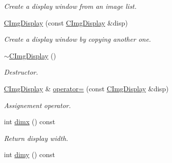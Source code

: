 \begin{DoxyCompactItemize}
\begin{DoxyCompactList}\small\item\em Create a display window from an image list. \item\end{DoxyCompactList}\item 
\hyperlink{structcimg__library_1_1_c_img_display_ad4267bd4ac382369ba69af62eb110794}{CImgDisplay} (const \hyperlink{structcimg__library_1_1_c_img_display}{CImgDisplay} \&disp)
\begin{DoxyCompactList}\small\item\em Create a display window by copying another one. \item\end{DoxyCompactList}\item 
\hypertarget{structcimg__library_1_1_c_img_display_ac74bd2dc3ff700966eae996505e63080}{
\hyperlink{structcimg__library_1_1_c_img_display_ac74bd2dc3ff700966eae996505e63080}{$\sim$CImgDisplay} ()}
\label{structcimg__library_1_1_c_img_display_ac74bd2dc3ff700966eae996505e63080}

\begin{DoxyCompactList}\small\item\em Destructor. \item\end{DoxyCompactList}\item 
\hypertarget{structcimg__library_1_1_c_img_display_a4f6a068b54eab95307a8c6fa0fcc6ba3}{
\hyperlink{structcimg__library_1_1_c_img_display}{CImgDisplay} \& \hyperlink{structcimg__library_1_1_c_img_display_a4f6a068b54eab95307a8c6fa0fcc6ba3}{operator=} (const \hyperlink{structcimg__library_1_1_c_img_display}{CImgDisplay} \&disp)}
\label{structcimg__library_1_1_c_img_display_a4f6a068b54eab95307a8c6fa0fcc6ba3}

\begin{DoxyCompactList}\small\item\em Assignement operator. \item\end{DoxyCompactList}\item 
\hypertarget{structcimg__library_1_1_c_img_display_aeaa3fc85ddcbb5b6737d2b677d295243}{
int \hyperlink{structcimg__library_1_1_c_img_display_aeaa3fc85ddcbb5b6737d2b677d295243}{dimx} () const }
\label{structcimg__library_1_1_c_img_display_aeaa3fc85ddcbb5b6737d2b677d295243}

\begin{DoxyCompactList}\small\item\em Return display width. \item\end{DoxyCompactList}\item 
\hypertarget{structcimg__library_1_1_c_img_display_a9fb21a66affb6e99ce6d09a2343b143d}{
int \hyperlink{structcimg__library_1_1_c_img_display_a9fb21a66affb6e99ce6d09a2343b143d}{dimy} () const }
\label{structcimg__library_1_1_c_img_display_a9fb21a66affb6e99ce6d09a2343b143d}


\end{DoxyCompactItemize}
